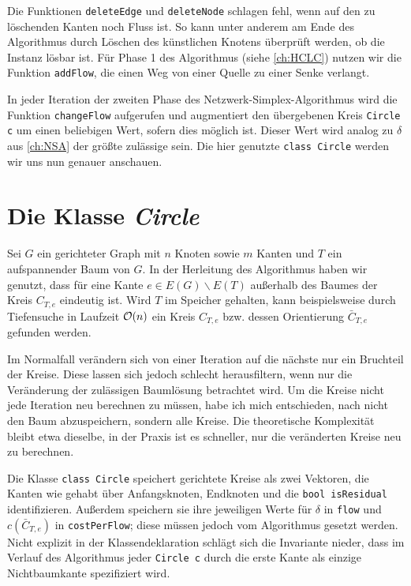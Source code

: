 Die Funktionen \lstinline|deleteEdge| und \lstinline|deleteNode| schlagen fehl, wenn auf den zu löschenden Kanten noch Fluss ist. So kann unter anderem am Ende des Algorithmus durch Löschen des künstlichen Knotens überprüft werden, ob die Instanz lösbar ist. Für Phase 1 des Algorithmus (siehe \cref{ch:HCLC}) nutzen wir die Funktion \lstinline|addFlow|, die einen Weg von einer Quelle zu einer Senke verlangt.

In jeder Iteration der zweiten Phase des Netzwerk-Simplex-Algorithmus wird die Funktion \lstinline|changeFlow| aufgerufen und augmentiert den übergebenen Kreis \lstinline|Circle c| um einen beliebigen Wert, sofern dies möglich ist. Dieser Wert wird analog zu $\delta$ aus \cref{ch:NSA} der größte zulässige sein. Die hier genutzte \lstinline|class Circle| werden wir uns nun genauer anschauen.

\section{Die Klasse \emph{Circle}}
Sei $G$ ein gerichteter Graph mit $n$ Knoten sowie $m$ Kanten und $T$ ein aufspannender Baum von $G$. In der Herleitung des Algorithmus haben wir genutzt, dass für eine Kante $e\in E(G)\backslash E(T)$ außerhalb des Baumes der Kreis $C_{T,e}$ eindeutig ist. Wird $T$ im Speicher gehalten, kann beispielsweise durch Tiefensuche in Laufzeit $\mathcal{O}(n)$ ein Kreis $C_{T,e}$ bzw. dessen Orientierung $\bar{C}_{T,e}$ gefunden werden.

Im Normalfall verändern sich von einer Iteration auf die nächste nur ein Bruchteil der Kreise. Diese lassen sich jedoch schlecht herausfiltern, wenn nur die Veränderung der zulässigen Baumlösung betrachtet wird. Um die Kreise nicht jede Iteration neu berechnen zu müssen, habe ich mich entschieden, nach \cite{betreuer} nicht den Baum abzuspeichern, sondern alle Kreise. Die theoretische Komplexität bleibt etwa dieselbe,\footnotemark{} in der Praxis ist es schneller, nur die veränderten Kreise neu zu berechnen.


Die Klasse \lstinline|class Circle| speichert gerichtete Kreise als zwei Vektoren, die Kanten wie gehabt über Anfangsknoten, Endknoten und die \lstinline|bool isResidual| identifizieren. Außerdem speichern sie ihre jeweiligen Werte für $\delta$ in \lstinline|flow| und $c(\bar{C}_{T,e})$ in \lstinline|costPerFlow|; diese müssen jedoch vom Algorithmus gesetzt werden. Nicht explizit in der Klassendeklaration schlägt sich die Invariante nieder, dass im Verlauf des Algorithmus jeder \lstinline|Circle c| durch die erste Kante als einzige Nichtbaumkante spezifiziert wird.


